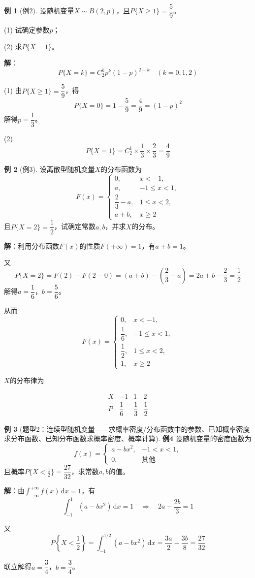 \documentclass[11pt,a4paper]{report}
\theoremstyle{definition}
\newtheorem{example}{例}[chapter]
\theoremstyle{plain}
\begin{document}
\begin{example}[例2]
设随机变量\(X\sim B(2,p)\)，且\(P\{X\geq 1\}=\dfrac{5}{9}\)。

(1) 试确定参数\(p\)；

(2) 求\(P\{X=1\}\)。

\textbf{解}：
\[
P\{X=k\}=C_2^k p^k(1-p)^{2-k}\quad(k=0,1,2)
\]

(1) 由\(P\{X\geq 1\}=\dfrac{5}{9}\)，得
\[
P\{X=0\}=1-\frac{5}{9}=\frac{4}{9}=(1-p)^2
\]
解得\(p=\dfrac{1}{3}\)。

(2)
\[
P\{X=1\}=C_2^1\times\frac{1}{3}\times\frac{2}{3}=\frac{4}{9}
\]
\end{example}

\begin{example}[例3]
设离散型随机变量\(X\)的分布函数为
\[
F(x)=\begin{cases}
0, & x<-1, \\[6pt]
a, & -1\leq x<1, \\[6pt]
\dfrac{2}{3}-a, & 1\leq x<2, \\[8pt]
a+b, & x\geq 2
\end{cases}
\]
且\(P\{X=2\}=\dfrac{1}{2}\)，试确定常数\(a,b\)，并求\(X\)的分布。

\textbf{解}：利用分布函数\(F(x)\)的性质\(F(+\infty)=1\)，有\(a+b=1\)。

又
\[
P\{X=2\}=F(2)-F(2-0)=(a+b)-\left(\frac{2}{3}-a\right)=2a+b-\frac{2}{3}=\frac{1}{2}
\]
解得\(a=\dfrac{1}{6}\)，\(b=\dfrac{5}{6}\)。

从而
\[
F(x)=\begin{cases}
0, & x<-1, \\[6pt]
\dfrac{1}{6}, & -1\leq x<1, \\[8pt]
\dfrac{1}{2}, & 1\leq x<2, \\[8pt]
1, & x\geq 2
\end{cases}
\]

\(X\)的分布律为

\[
\begin{array}{c|ccc}
X & -1 & 1 & 2 \\ \hline
P & \dfrac{1}{6} & \dfrac{1}{3} & \dfrac{1}{2}
\end{array}
\]
\end{example}

\begin{example}[题型2：连续型随机变量——求概率密度/分布函数中的参数、已知概率密度求分布函数、已知分布函数求概率密度、概率计算]

\textbf{例4} 设随机变量的密度函数为
\[
f(x)=\begin{cases}
a-bx^2, & -1<x<1, \\[6pt]
0, & \text{其他}
\end{cases}
\]
且概率\(P\{X<\frac{1}{2}\}=\dfrac{27}{32}\)，求常数\(a,b\)的值。

\textbf{解}：由\(\int_{-\infty}^{+\infty}f(x)\,\mathrm{d}x=1\)，有
\[
\int_{-1}^{1}(a-bx^2)\,\mathrm{d}x=1\quad\Longrightarrow\quad 2a-\frac{2b}{3}=1
\]

又
\[
P\left\{X<\frac{1}{2}\right\}=\int_{-1}^{1/2}(a-bx^2)\,\mathrm{d}x=\frac{3a}{2}-\frac{3b}{8}=\frac{27}{32}
\]

联立解得\(a=\dfrac{3}{4}\)，\(b=\dfrac{3}{4}\)。
\end{example}
\end{document}
